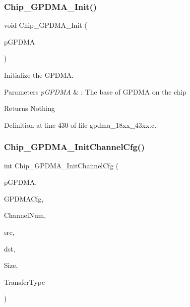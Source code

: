 \subsubsection{\texorpdfstring{Chip\+\_\+\+G\+P\+D\+M\+A\+\_\+\+Init()}{Chip\_GPDMA\_Init()}}
{\footnotesize\ttfamily void Chip\+\_\+\+G\+P\+D\+M\+A\+\_\+\+Init (\begin{DoxyParamCaption}\item[{\hyperlink{struct_l_p_c___g_p_d_m_a___t}{L\+P\+C\+\_\+\+G\+P\+D\+M\+A\+\_\+T} $\ast$}]{p\+G\+P\+D\+MA }\end{DoxyParamCaption})}



Initialize the G\+P\+D\+MA. 


\begin{DoxyParams}{Parameters}
{\em p\+G\+P\+D\+MA} & \+: The base of G\+P\+D\+MA on the chip \\
\hline
\end{DoxyParams}
\begin{DoxyReturn}{Returns}
Nothing 
\end{DoxyReturn}


Definition at line 430 of file gpdma\+\_\+18xx\+\_\+43xx.\+c.

\mbox{\label{group___g_p_d_m_a__18_x_x__43_x_x_gac32ac477dbee2d3be93ca90b30db856c}} 
\subsubsection{\texorpdfstring{Chip\+\_\+\+G\+P\+D\+M\+A\+\_\+\+Init\+Channel\+Cfg()}{Chip\_GPDMA\_InitChannelCfg()}}
{\footnotesize\ttfamily int Chip\+\_\+\+G\+P\+D\+M\+A\+\_\+\+Init\+Channel\+Cfg (\begin{DoxyParamCaption}\item[{\hyperlink{struct_l_p_c___g_p_d_m_a___t}{L\+P\+C\+\_\+\+G\+P\+D\+M\+A\+\_\+T} $\ast$}]{p\+G\+P\+D\+MA,  }\item[{\hyperlink{struct_g_p_d_m_a___c_h___c_f_g___t}{G\+P\+D\+M\+A\+\_\+\+C\+H\+\_\+\+C\+F\+G\+\_\+T} $\ast$}]{G\+P\+D\+M\+A\+Cfg,  }\item[{uint8\+\_\+t}]{Channel\+Num,  }\item[{uint32\+\_\+t}]{src,  }\item[{uint32\+\_\+t}]{dst,  }\item[{uint32\+\_\+t}]{Size,  }\item[{\hyperlink{group___g_p_d_m_a__18_x_x__43_x_x_ga2cb59b641cd840f22780c44be1208133}{G\+P\+D\+M\+A\+\_\+\+F\+L\+O\+W\+\_\+\+C\+O\+N\+T\+R\+O\+L\+\_\+T}}]{Transfer\+Type }\end{DoxyParamCaption})}



